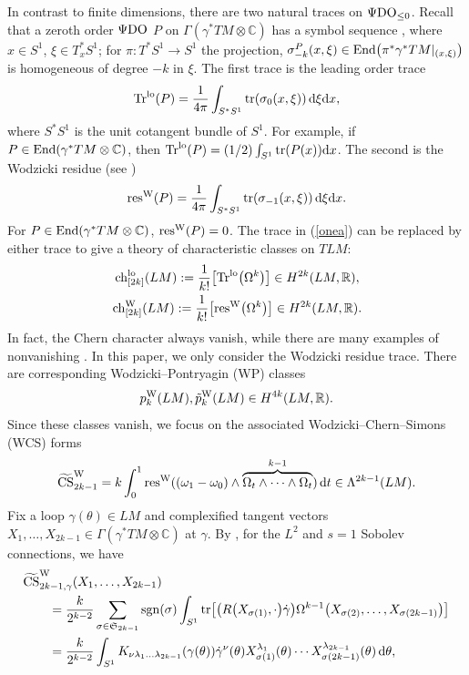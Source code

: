 \documentclass[pdftex]{sigma}
\numberwithin{equation}{section}
\theoremstyle{definition}
\newcommand{\BbR}{{\mathbb R}}
\newcommand{\BbC}{{\mathbb C}}
\newcommand{\pdo}{\Psi{\rm DO}}
\newcommand{\R}{\BbR}
\newcommand{\C}{\BbC}
\newcommand{\Tr}{{\rm Tr}}
\newcommand{\tr}{{\rm tr}}
\newcommand{\resw}{{\rm res}^{\rm W}}
\newcommand{\ocs}{\widetilde{{\rm CS}}}
\newcommand{\tp}{\tilde p}
\newcommand{\dg}{\dot\gamma}
\begin{document}
In contrast to finite dimensions, there are two natural traces on $\pdo_{\leq 0}$. Recall that a zeroth order $\pdo$
$P$ on $\Gamma(\gamma^*TM\otimes \C)$ has a symbol sequence , where
$x\in S^1$, ${\xi\in T^*_xS^1}$; for $\pi\colon T^*S^1\to S^1$ the projection, $\sigma^P_{-k}(x,\xi)\in {\rm End}\bigl(\pi^*\gamma^*TM|_{(x,\xi)}\bigr)$ is homogeneous of degree $-k$ in $\xi$. The first trace is the leading order trace
\[\Tr^{{\rm lo}}(P) =\frac{1}{4\pi} \int_{S^*S^1} \tr (\sigma_0(x,\xi) )\, {\rm d}\xi{\rm d}x,\]
where $S^*S^1$ is the unit cotangent bundle of $S^1$. For example, if $P\in {\rm End}(\gamma^*TM\otimes \C)$, then
$\Tr^{\rm lo}(P) = (1/2)\int_{S^1} \tr(P(x)) {\rm d}x$. The second
 is the Wodzicki residue (see \cite{fgls})
 \[\resw(P) = \frac{1}{4\pi}\int_{S^*S^1} \tr ( \sigma_{-1}(x,\xi)) \, {\rm d}\xi{\rm d}x.\]
 For $P\in {\rm End}(\gamma^*TM\otimes \C)$, $\resw(P) = 0$. The trace in (\ref{onea}) can be replaced by either trace to give a theory of characteristic classes on $TLM$:
 \begin{gather*}{\rm ch}_{[2k]}^{\rm lo}(LM) := \frac{1}{k!}\bigl[\Tr^{\rm lo}\bigl(\Omega^k\bigr)\bigr]\in H^{2k}(LM,\R), \\
 {\rm ch}_{[2k]}^{\rm W}(LM) := \frac{1}{k!}\bigl[\resw\bigl(\Omega^k\bigr)\bigr]\in H^{2k}(LM,\R).
 \end{gather*}
 In fact, the Chern character  always vanish, while there are many examples of nonvanishing  \cite{lrst}.
 In this paper, we only consider the Wodzicki residue trace.
There are corresponding Wodzicki--Pontryagin (WP) classes
\[p_k^{\rm W}(LM),\tp_k^{\rm W}(LM) \in H^{4k}(LM,\R).\]
Since these classes vanish, we focus on the associated Wodzicki--Chern--Simons (WCS) forms
\[\ocs^{\rm W}_{2k-1} = k
\int_0^1 \resw((\omega_1 - \omega_0)\wedge \overbrace{\Omega_t
\wedge\cdots\wedge\Omega_t}^{k-1}) \, {\rm d}t\in\Lambda^{2k-1}(LM).\]
Fix a loop $\gamma(\theta)\in LM$ and complexified tangent vectors $X_1, \dots,X_{2k-1}\in \Gamma(\gamma^*TM\otimes \C)$ at $\gamma$.
By \cite[equation~(2.9)]{MRT4}, for the $L^2$ and $s=1$ Sobolev connections, we have
 \begin{align}
&\ocs^{\rm W}_{2k-1,\gamma} (X_1,\dots ,X_{2k-1}) \nonumber\\
&\qquad{}=
\frac{k}{2^{k-2}}
\sum_{\sigma\in \mathfrak S_{2k-1}} {\rm sgn}(\sigma) \int_{S^1}\tr\bigl[
 \bigl(R\bigl(X_{\sigma(1)},\cdot\bigr)\dg\bigr)
 \Omega^{k-1}\bigl(X_{\sigma(2)},\dots,X_{\sigma(2k-1)} \bigr)\bigr]\nonumber\\
 &\qquad{}= \frac{k}{2^{k-2}}
\int_{S^1}
 K_{\nu \lambda_1 \dots \lambda_{2k-1}} (\gamma (\theta))
{\dot \gamma}^{\nu} (\theta )
X_{\sigma(1)}^{\lambda_{1}}(\theta ) \cdots X_{ \sigma(2k-1)}^{\lambda_{2k-1}}(\theta)
\, {\rm d}\theta,\label{csg}
\end{align}
\end{document}
